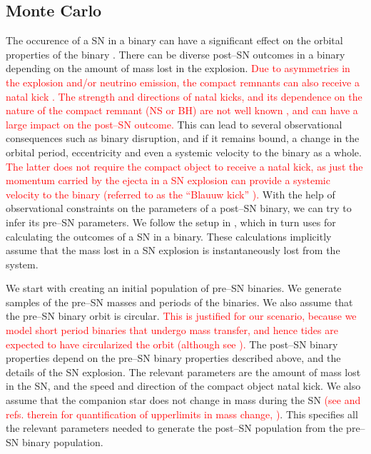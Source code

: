 \documentclass[linenumbers,trackchanges,twocolumn]{aastex701}
\newcommand{\red}{\textcolor{red}}
\begin{document}
\subsection{Monte Carlo}

The occurence of a SN in a binary can have a significant effect on the orbital properties of the binary \red{\citep{1994astro.ph.12023B,2025OJAp....8E..85W}}. There can be diverse post--SN outcomes in a binary depending on the amount of mass lost in the explosion. \red{Due to asymmetries in the explosion and/or neutrino emission, the compact remnants can also receive a natal kick \citep{2012ARNPS..62..407J,2017ApJ...837...84J}. The strength and directions of natal kicks, and its dependence on the nature of the compact remnant (NS or BH) are not well known \citep{2005MNRAS.360..974H, 2025PASP..137c4203N}, and can have a large impact on the post--SN outcome.} This can lead to several observational consequences such as binary disruption, and if it remains bound, a change in the orbital period, eccentricity and even a systemic velocity to the binary as a whole. \red{The latter does not require the compact object to receive a natal kick, as just the momentum carried by the ejecta in a SN explosion can provide a systemic velocity to the binary (referred to as the ``Blauuw kick'' \cite{1961BAN....15..265B}).} With the help of observational constraints on the parameters of a post--SN binary, we can try to infer its pre--SN parameters. We follow the setup in \citep{2024OJAp....7E..38E}, which in turn uses \citep{1994astro.ph.12023B} for calculating the outcomes of a SN in a binary. These calculations implicitly assume that the mass lost in a SN explosion is instantaneously lost from the system.

We start with creating an initial population of pre--SN binaries. We generate samples of the pre--SN masses and periods of the binaries. We also assume that the pre--SN binary orbit is circular. \red{This is justified for our scenario, because we model short period binaries that undergo mass transfer, and hence tides are expected to have circularized the orbit (although see \cite{2009MNRAS.400L..20E, 2025ApJ...983...39R}).} The post--SN binary properties depend on the pre--SN binary properties described above, and the details of the SN explosion. The relevant parameters are the amount of mass lost in the SN, and the speed and direction of the compact object natal kick. We also assume that the companion star does not change in mass during the SN \red{(see \cite{1998A&A...330.1047T} and refs. therein for quantification of upperlimits in mass change, \cite{2018PhDT.......211H,2021MNRAS.505.2485O})}. This specifies all the relevant parameters needed to generate the post--SN population from the pre--SN binary population. 
\end{document}
